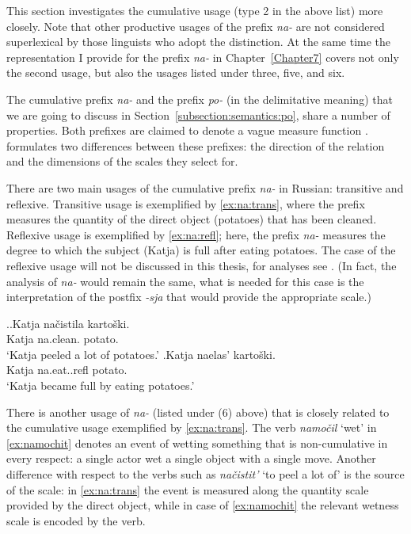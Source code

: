 This section investigates the cumulative usage (type 2 in the above list) more closely. Note that other productive usages of the prefix \textit{na-} are not considered superlexical by those linguists who adopt the distinction. At the same time the representation I provide for the prefix \textit{na-} in Chapter~\ref{Chapter7} covers not only the second usage, but also the usages listed under three, five, and six.

The cumulative prefix \textit{na-} and the prefix \textit{po-} (in the delimitative meaning) that we are going to discuss in Section~\ref{subsection:semantics:po}, share a number of properties. Both prefixes are claimed to denote a vague measure function \citep{Filip:00, Souchkova:04}. \citet{Souchkova:04} formulates two differences between these prefixes: the direction of the relation and the dimensions of the scales they select for.

There are two main usages of the cumulative prefix \textit{na-} in Russian: transitive and reflexive. Transitive usage is exemplified by \ref{ex:na:trans}, where the prefix measures the quantity of the direct object (potatoes) that has been cleaned. Reflexive usage is exemplified by \ref{ex:na:refl}; here, the prefix \textit{na-} measures the degree to which the subject (Katja) is full after eating potatoes. The case of the reflexive usage will not be discussed in this thesis, for analyses see \citet{KaganPereltsvaig:11a,KaganPereltsvaig:11b,Souchkova:04,Filip:00,Filip:05}. (In fact, the analysis of \textit{na-} would remain the same, what is needed for this case is the interpretation of the postfix \textit{-sja} that would provide the appropriate scale.)

\ex.\ag.\label{ex:na:trans}Katja na\v{c}istila karto\v{s}ki.\\
Katja na.clean. potato.\\
\trans `Katja peeled a lot of potatoes.'
\bg.\label{ex:na:refl}Katja naelas' karto\v{s}ki.\\
Katja na.eat..refl potato.\\
\trans `Katja became full by eating potatoes.'

There is another usage of \textit{na-} (listed under (6) above) that is closely related to the cumulative usage exemplified by \ref{ex:na:trans}. The verb \textit{namo\v{c}il} `wet' in \ref{ex:namochit} denotes an event of wetting something that is non-cumulative in every respect: a single actor wet a single object with a single move. Another difference with respect to the verbs such as \textit{na\v{c}istit'} `to peel a lot of' is the source of the scale: in \ref{ex:na:trans} the event is measured along the quantity scale provided by the direct object, while in case of \ref{ex:namochit} the relevant wetness scale is encoded by the verb.

